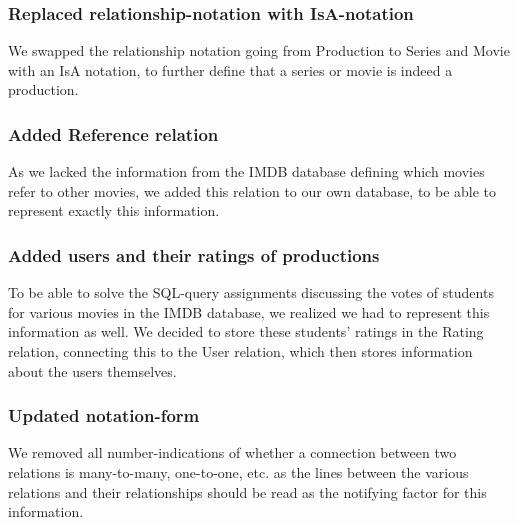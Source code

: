 \subsubsection{Replaced relationship-notation with IsA-notation}
We swapped the relationship notation going from Production to Series and Movie with an IsA notation, to further define that a series or movie is indeed a production.

\subsubsection{Added Reference relation}
As we lacked the information from the IMDB database defining which movies refer to other movies, we added this relation to our own database, to be able to represent exactly this information.

\subsubsection{Added users and their ratings of productions}
To be able to solve the SQL-query assignments discussing the votes of students for various movies in the IMDB database, we realized we had to represent this information as well. We decided to store these students' ratings in the Rating relation, connecting this to the User relation, which then stores information about the users themselves.

\subsubsection{Updated notation-form}
We removed all number-indications of whether a connection between two relations is many-to-many, one-to-one, etc. as the lines between the various relations and their relationships should be read as the notifying factor for this information.